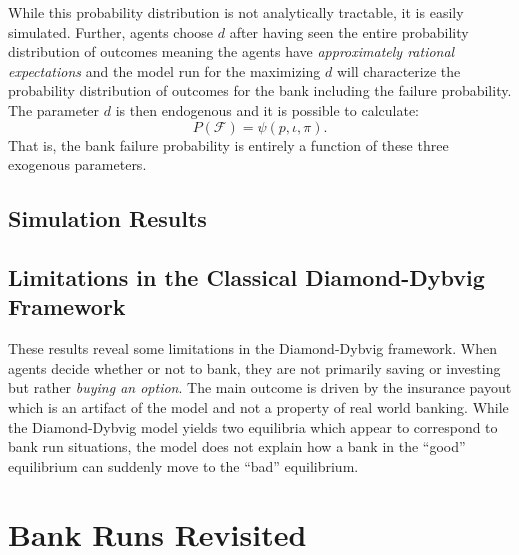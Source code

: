 \documentclass[12pt]{article}
\begin{document}
\begin{doublespace}
While this probability distribution is not analytically tractable, it is easily simulated. Further, agents choose $d$ after having seen the entire probability distribution of outcomes meaning the agents have \emph{approximately rational expectations} and the model run for the maximizing $d$ will characterize the probability distribution of outcomes for the bank including the failure probability. The parameter $d$ is then endogenous and it is possible to calculate:
$$P\left(\mathcal{F}\right)=\psi\left(p,\iota,\pi\right).$$ 
That is, the bank failure probability is entirely a function of these three exogenous parameters. 
\subsection{Simulation Results}


\subsection{Limitations in the Classical Diamond-Dybvig Framework}


These results reveal some limitations in the Diamond-Dybvig framework. When agents
decide whether or not to bank, they are not primarily saving or investing but 
rather \emph{buying an option}. The main outcome is driven by the insurance 
payout which is an artifact of the model and not a property of real world banking.
While the Diamond-Dybvig model yields two equilibria which appear to correspond 
to bank run situations, the model does not explain how a bank in the 
``good'' equilibrium can suddenly move to the ``bad'' equilibrium. 



\section{Bank Runs Revisited}


\end{doublespace}
\end{document}
